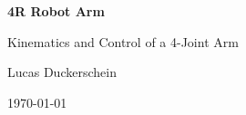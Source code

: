 \begin{titlepage}
  \centering
  \vspace*{3cm}
  {\Huge\bfseries 4R Robot Arm\par}
  \vspace{1cm}
  {\Large Kinematics and Control of a 4-Joint Arm\par}
  \vfill
  {\large Lucas Duckerschein\par}
  \vspace{0.5cm}
  {\large \today\par}
\end{titlepage}
